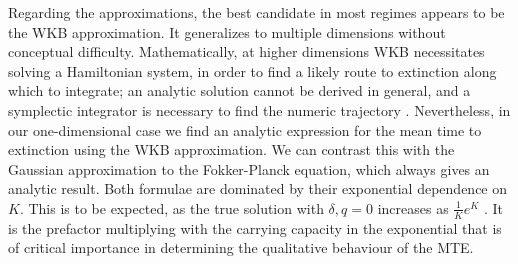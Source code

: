 \documentclass[a4paper,10pt]{article}
\numberwithin{equation}{section} %
\begin{document}
Regarding the approximations, the best candidate in most regimes appears to be the WKB approximation. 
It generalizes to multiple dimensions without conceptual difficulty.
Mathematically, at higher dimensions WKB necessitates solving a Hamiltonian system, in order to find a likely route to extinction along which to integrate; an analytic solution cannot be derived in general, and a symplectic integrator is necessary to find the numeric trajectory \cite{}. 
Nevertheless, in our one-dimensional case we find an analytic expression for the mean time to extinction using the WKB approximation.%
We can contrast this with the Gaussian approximation to the Fokker-Planck equation, which always gives an analytic result.%
Both formulae are dominated by their exponential dependence on $K$. 
This is to be expected, as the true solution with $\delta,q = 0$ increases as $\frac{1}{K}e^K$ \cite{Lande1993}. 
It is the prefactor multiplying with the carrying capacity in the exponential that is of critical importance in determining the qualitative behaviour of the MTE. 
\end{document}
